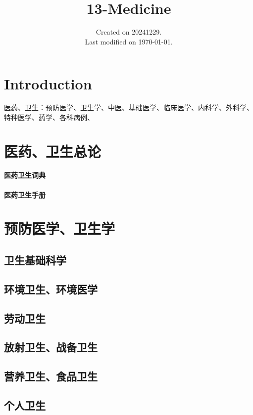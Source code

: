 \documentclass[UTF8]{../ApplicationUniverse}
\begin{document}
\title{13-Medicine}
\date{Created on 20241229.\\   Last modified on \today.}
\maketitle
\tableofcontents


\chapter{Introduction}


医药、卫生：预防医学、卫生学、中医、基础医学、临床医学、内科学、外科学、特种医学、药学、各科病例、



\chapter{医药、卫生总论}
\subsubsection{医药卫生词典}
\subsubsection{医药卫生手册}

\chapter{预防医学、卫生学}
\section{卫生基础科学}
\section{环境卫生、环境医学}
\section{劳动卫生}
\section{放射卫生、战备卫生}
\section{营养卫生、食品卫生}
\section{个人卫生}
\end{document}
